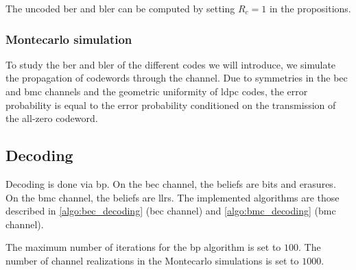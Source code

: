 The uncoded \acrshort{ber} and \acrshort{bler} can be computed by setting $R_c =
    1$ in the propositions.

\subsubsection{Montecarlo simulation}
To study the \acrlong{ber} and \acrlong{bler} of the different codes we will
introduce, we simulate the propagation of codewords through the channel. Due to
symmetries in the \acrshort{bec} and \acrshort{bmc} channels and the geometric
uniformity of \acrshort{ldpc} codes, the error probability is equal to the error
probability conditioned on the transmission of the all-zero codeword.


\subsection{Decoding}\label{subsec:bp_decoding}
Decoding is done via \acrfull{bp}. On the \acrshort{bec} channel, the beliefs
are bits and erasures. On the \acrshort{bmc} channel, the beliefs are
\acrlong{llr}s. The implemented algorithms are those described in
\autoref{algo:bec_decoding} (\acrshort{bec} channel) and
\autoref{algo:bmc_decoding} (\acrshort{bmc} channel).

The maximum number of iterations for the \acrshort{bp} algorithm is set to
$100$. The number of channel realizations in the Montecarlo simulations is set
to $1000$.


